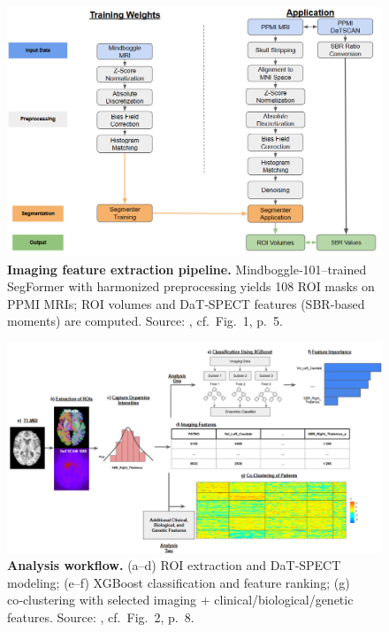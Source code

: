 \documentclass[11pt]{article}
\begin{document}
\begin{figure}[h!]
    \centering
    \includegraphics[width=0.85\linewidth]{figures/SegmentationPreprocessing.png}
    \caption{\textbf{Imaging feature extraction pipeline.} Mindboggle‑101–trained SegFormer with harmonized preprocessing yields 108 ROI masks on PPMI MRIs; ROI volumes and DaT‑SPECT features (SBR‑based moments) are computed. Source: \cite{dominick2025brain}, cf.\ Fig.~1, p.~5.}
    \label{fig:datscan-pipeline}
\end{figure}

\begin{figure}[h!]
    \centering
    \includegraphics[width=\linewidth]{figures/NewProcess.png}
    \caption{\textbf{Analysis workflow.} (a–d) ROI extraction and DaT‑SPECT modeling; (e–f) XGBoost classification and feature ranking; (g) co‑clustering with selected imaging + clinical/biological/genetic features. Source: \cite{dominick2025brain}, cf.\ Fig.~2, p.~8.}
    \label{fig:imaging-workflow}
\end{figure}
\end{document}
